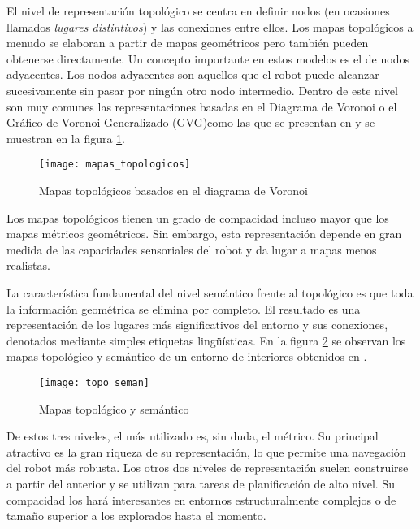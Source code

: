 \clearpage


El nivel de representación topológico se centra en definir nodos (en ocasiones llamados \emph{lugares distintivos}) y las conexiones entre ellos. Los mapas topológicos a menudo se elaboran a partir de mapas geométricos pero también pueden obtenerse directamente. Un concepto importante en estos modelos es el de nodos adyacentes. Los nodos adyacentes son aquellos que el robot puede alcanzar sucesivamente sin pasar por ningún otro nodo intermedio. Dentro de este nivel son muy comunes las representaciones basadas en el Diagrama de Voronoi o el Gráfico de Voronoi Generalizado (GVG)como las que se presentan en \cite{Choset01} y se muestran en la figura \ref{fg:topologicos}.

\begin{figure}[hbtp]
  \centering\texttt{[image: mapas\_topologicos]}\\
  \caption{Mapas topológicos basados en el diagrama de Voronoi}\label{fg:topologicos}
\end{figure}

Los mapas topológicos tienen un grado de compacidad incluso mayor que los mapas métricos geométricos. Sin embargo, esta representación depende en gran medida de las capacidades sensoriales del robot y da lugar a mapas menos realistas.

La característica fundamental del nivel semántico frente al topológico es que toda la información geométrica se elimina por completo. El resultado es una representación de los lugares más significativos del entorno y sus conexiones, denotados mediante simples etiquetas lingüísticas. En la figura \ref{fg:semantico} se observan los mapas topológico y semántico de un entorno de interiores obtenidos en \cite{Kuipers91}.

\begin{figure}[hbtp]
  \centering\texttt{[image: topo\_seman]}\\
  \caption{Mapas topológico y semántico}\label{fg:semantico}
\end{figure}

De estos tres niveles, el más utilizado es, sin duda, el métrico. Su principal atractivo es la gran riqueza de su representación, lo que permite una navegación del robot más robusta. Los otros dos niveles de representación suelen construirse a partir del anterior y se utilizan para tareas de planificación de alto nivel. Su compacidad los hará interesantes en entornos estructuralmente complejos o de tamaño superior a los explorados hasta el momento.


